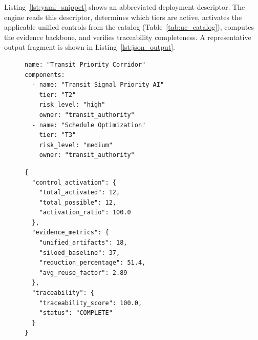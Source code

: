 Listing~\ref{lst:yaml_snippet} shows an abbreviated deployment
descriptor. The engine reads this descriptor, determines which tiers
are active, activates the applicable unified controls from the catalog
(Table~\ref{tab:uc_catalog}), computes the evidence backbone, and
verifies traceability completeness. A representative output fragment is
shown in Listing~\ref{lst:json_output}.

\begin{figure}[t]
\begin{lstlisting}[language={},basicstyle=\ttfamily\scriptsize,
  caption={Abbreviated YAML deployment descriptor for the transit
  priority corridor scenario.},label={lst:yaml_snippet},
  frame=single,xleftmargin=0.5em,numbers=none]
name: "Transit Priority Corridor"
components:
  - name: "Transit Signal Priority AI"
    tier: "T2"
    risk_level: "high"
    owner: "transit_authority"
  - name: "Schedule Optimization"
    tier: "T3"
    risk_level: "medium"
    owner: "transit_authority"
\end{lstlisting}
\end{figure}

\begin{figure}[t]
\begin{lstlisting}[language={},basicstyle=\ttfamily\scriptsize,
  caption={Representative JSON output fragment showing control
  activation and evidence metrics for the transit priority
  corridor.},label={lst:json_output},
  frame=single,xleftmargin=0.5em,numbers=none]
{
  "control_activation": {
    "total_activated": 12,
    "total_possible": 12,
    "activation_ratio": 100.0
  },
  "evidence_metrics": {
    "unified_artifacts": 18,
    "siloed_baseline": 37,
    "reduction_percentage": 51.4,
    "avg_reuse_factor": 2.89
  },
  "traceability": {
    "traceability_score": 100.0,
    "status": "COMPLETE"
  }
}
\end{lstlisting}
\end{figure}




